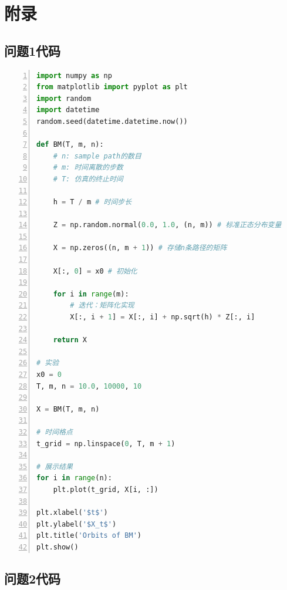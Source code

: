 \documentclass{article}
\begin{document}
\section{附录}

\subsection{问题1代码}

\begin{lstlisting}[language = python, numbers=left, numberstyle=\tiny, keywordstyle=\color{blue!70}, commentstyle=\color{red!50!green!50!blue!50},frame=shadowbox,rulesepcolor=\color{red!20!green!20!blue!20},basicstyle=\ttfamily]
import numpy as np
from matplotlib import pyplot as plt
import random
import datetime
random.seed(datetime.datetime.now())

def BM(T, m, n): 
    # n: sample path的数目
    # m: 时间离散的步数
    # T: 仿真的终止时间
    
    h = T / m # 时间步长
    
    Z = np.random.normal(0.0, 1.0, (n, m)) # 标准正态分布变量
    
    X = np.zeros((n, m + 1)) # 存储n条路径的矩阵
    
    X[:, 0] = x0 # 初始化
    
    for i in range(m):
        # 迭代：矩阵化实现
        X[:, i + 1] = X[:, i] + np.sqrt(h) * Z[:, i]
    
    return X

# 实验
x0 = 0
T, m, n = 10.0, 10000, 10

X = BM(T, m, n)

# 时间格点
t_grid = np.linspace(0, T, m + 1)

# 展示结果
for i in range(n):
    plt.plot(t_grid, X[i, :])

plt.xlabel('$t$')
plt.ylabel('$X_t$')
plt.title('Orbits of BM')
plt.show()
\end{lstlisting}

\subsection{问题2代码}
\end{document}
